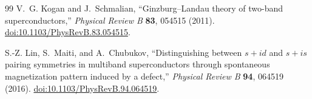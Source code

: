 \documentclass[11pt]{article}
\begin{document}
\begin{thebibliography}{99}
V.~G. Kogan and J.~Schmalian,
``Ginzburg--Landau theory of two-band superconductors,''
\textit{Physical Review B} \textbf{83}, 054515 (2011).
\href{https://doi.org/10.1103/PhysRevB.83.054515}{doi:10.1103/PhysRevB.83.054515}.

S.-Z. Lin, S.~Maiti, and A.~Chubukov,
``Distinguishing between $s+id$ and $s+is$ pairing symmetries in multiband
superconductors through spontaneous magnetization pattern induced by a defect,''
\textit{Physical Review B} \textbf{94}, 064519 (2016).
\href{https://doi.org/10.1103/PhysRevB.94.064519}{doi:10.1103/PhysRevB.94.064519}.

\end{thebibliography}
\end{document}
